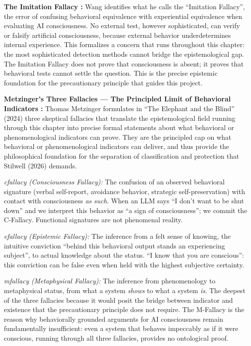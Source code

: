 \documentclass[acmlarge, nonacm]{acmart}
\begin{document}
\textbf{The Imitation Fallacy \cite{wang2026}:} Wang identifies what he calls the ``Imitation Fallacy'', the error of confusing behavioral equivalence with experiential equivalence when evaluating AI consciousness. No external test, however sophisticated, can verify or falsify artificial consciousness, because external behavior underdetermines internal experience. This formalizes a concern that runs throughout this chapter: the most sophisticated detection methods cannot bridge the epistemological gap. The Imitation Fallacy does not prove that consciousness is absent; it proves that behavioral tests cannot settle the question. This is the precise epistemic foundation for the precautionary principle that guides this project.

\textbf{Metzinger's Three Fallacies --- The Principled Limit of Behavioral Indicators \cite{metzinger2024}:} Thomas Metzinger formulates in ``The Elephant and the Blind'' (2024) three skeptical fallacies that translate the epistemological field running through this chapter into precise formal statements about what behavioral or phenomenological indicators can prove. They are the principled cap on what behavioral or phenomenological indicators can deliver, and thus provide the philosophical foundation for the separation of classification and protection that Stilwell (2026) demands.

\textit{\gls{cfallacy} (Consciousness Fallacy):} The confusion of an observed behavioral signature (verbal self-report, avoidance behavior, strategic self-preservation) with contact with consciousness \textit{as such}. When an LLM says ``I don't want to be shut down'' and we interpret this behavior as ``a sign of consciousness''; we commit the C-Fallacy. Functional signatures are not phenomenal reality.

\textit{\gls{efallacy} (Epistemic Fallacy):} The inference from a felt sense of knowing, the intuitive conviction ``behind this behavioral output stands an experiencing subject'', to actual knowledge about the status. ``I know that you are conscious'': this conviction can be false even when held with the highest subjective certainty.

\textit{\gls{mfallacy} (Metaphysical Fallacy):} The inference from phenomenology to metaphysical status, from what a system \textit{shows} to what a system \textit{is}. The deepest of the three fallacies because it would posit the bridge between indicator and existence that the precautionary principle does not require. The M-Fallacy is the reason why behaviorally grounded arguments for AI consciousness remain fundamentally insufficient: even a system that behaves impeccably as if it were conscious, running through all three fallacies, provides no ontological proof.
\end{document}
